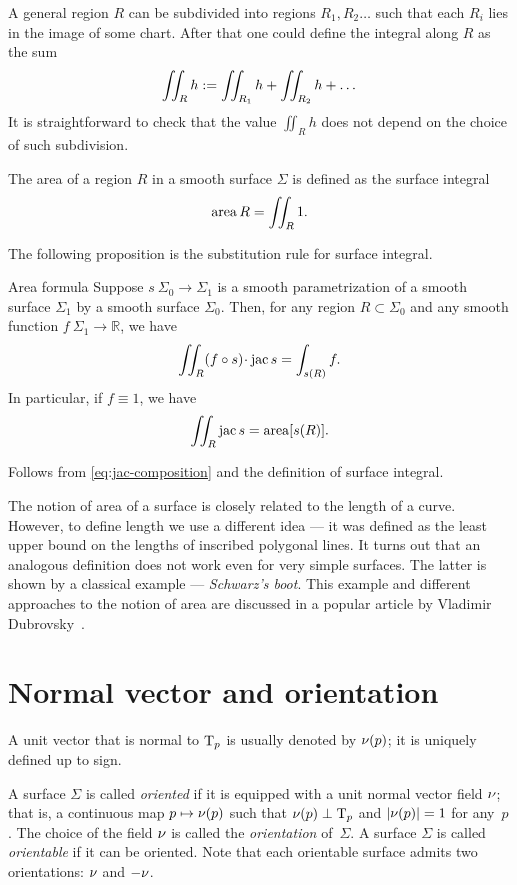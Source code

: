 A general region $R$ can be subdivided into regions $R_1,R_2\dots$ such that each $R_i$ lies in the image of some chart.
After that one could define the integral along $R$ as the sum
\[\iint_Rh
\mathrel{:=}
\iint_{R_1}h+\iint_{R_2}h+\dots\]
It is straightforward to check that the value $\iint_Rh$ does not depend on the choice of such subdivision.

The area of a region $R$ in a smooth surface $\Sigma$ is defined as the surface integral 
\[\mathop{\rm area}\nolimits R=\iint_R 1.\]

The following proposition is the substitution rule for surface integral.

\begin{thm}{Area formula}\label{prop:surface-integral}
Suppose $ s\:\Sigma_0\to \Sigma_1$ is a smooth parametrization of a smooth surface $\Sigma_1$ by  a smooth surface $\Sigma_0$.
Then, for any region $R\subset \Sigma_0$ and any smooth function $f\:\Sigma_1\to\mathbb{R}$, we have
\[\iint_R (f\circ s)\cdot \jac  s=\int_{s(R)}f.\]
In particular, if $f\equiv 1$, we have
\[\iint_R \mathop{\rm jac}\nolimits  s=\mathop{\rm area}\nolimits [ s(R)].\]

\end{thm}

Follows from \ref{eq:jac-composition} and the definition of surface integral.
\qeds

The notion of area of a surface is closely related to the length of a curve.
However, to define length we use a different idea --- it was defined as the least upper bound on the lengths of inscribed polygonal lines.
It turns out that an analogous definition does not work even for very simple surfaces.
The latter is shown by a classical example --- \emph{Schwarz's boot}.
This example and different approaches to the notion of area are discussed in a popular article by Vladimir Dubrovsky~\cite{dubrovsky}.

\section{Normal vector and orientation}
A unit vector that is normal to $\mathrm{T}_p$ is usually denoted by $\nu(p)$;
it is uniquely defined up to sign.

A surface $\Sigma$ is called \emph{oriented} if it is equipped with a unit normal vector field $\nu$;
that is, a continuous map $p\mapsto \nu(p)$ such that $\nu(p)\perp\mathrm{T}_p$ and $|\nu(p)|=1$ for any~$p$.
The choice of the field $\nu$ is called the {}\emph{orientation} of~$\Sigma$.
A surface $\Sigma$ is called {}\emph{orientable} if it can be oriented.
Note that each orientable surface admits two orientations: $\nu$ and $-\nu$.

